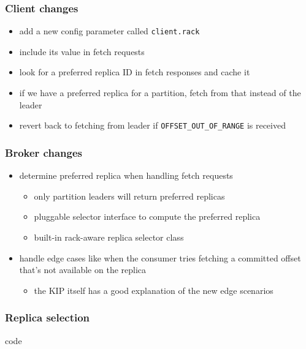 \documentclass{beamer}
\newlength{\wideitemsep}
\let\olditem\item
\renewcommand{\item}{\setlength{\itemsep}{\wideitemsep}\olditem}
\begin{document}
\begin{frame}
  \frametitle{Client changes}

  \begin{itemize}
  \item add a \alert{new config parameter} called \texttt{client.rack}
  \item include its value in \alert{fetch requests}
  \item look for a \alert{preferred replica ID} in fetch responses and cache it
  \item if we have a preferred replica for a partition, \alert{fetch from that} instead of the leader
  \item revert back to \alert{fetching from leader} if \texttt{OFFSET\_OUT\_OF\_RANGE} is received
  \end{itemize}
\end{frame}

\begin{frame}
  \frametitle{Broker changes}

  \begin{itemize}
  \item determine \alert{preferred replica} when handling fetch requests
    \begin{itemize}
    \item only \alert{partition leaders} will return preferred replicas
    \item \alert{pluggable} selector interface to compute the preferred replica
    \item \alert{built-in} rack-aware replica selector class
    \end{itemize}
  \item handle \alert{edge cases} like when the consumer tries fetching a committed offset that's not available on the replica
    \begin{itemize}
    \item the KIP itself has a good explanation of the new edge scenarios
    \end{itemize}
  \end{itemize}
\end{frame}

\begin{frame}
  \frametitle{Replica selection}

  \begin{beamercolorbox}[sep=1em]{code}
    
  \end{beamercolorbox}
\end{frame}
\end{document}
